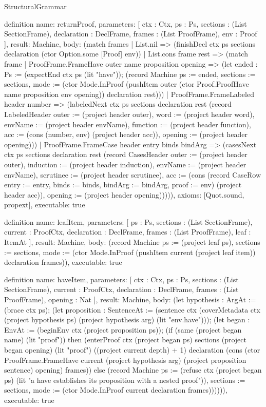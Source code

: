 \begin{lexlean}{StructuralGrammar}
\begin{semanticmodule}
{{definition{
  name: returnProof,
  parameters: [
    ctx : Ctx,
    ps : Ps,
    sections : (List SectionFrame),
    declaration : DeclFrame,
    frames : (List ProofFrame),
    env : Proof
  ],
  result: Machine,
  body: (match frames
    | List.nil => (finishDecl ctx ps sections declaration (ctor Option.some [Proof] env))
    | List.cons frame rest => (match frame
      | ProofFrame.FrameHave outer name proposition opening => (let ended : Ps := (expectEnd ctx ps (lit "have")); (record Machine {ps := ended, sections := sections, mode := (ctor Mode.InProof (pushItem outer (ctor Proof.ProofHave name proposition env opening)) declaration rest)}))
      | ProofFrame.FrameLabeled header number => (labeledNext ctx ps sections declaration rest (record LabeledHeader {outer := (project header outer), word := (project header word), envName := (project header envName), function := (project header function), acc := (cons (number, env) (project header acc)), opening := (project header opening)}))
      | ProofFrame.FrameCase header entry binds bindArg => (casesNext ctx ps sections declaration rest (record CasesHeader {outer := (project header outer), induction := (project header induction), envName := (project header envName), scrutinee := (project header scrutinee), acc := (cons (record CaseRow {entry := entry, binds := binds, bindArg := bindArg, proof := env}) (project header acc)), opening := (project header opening)})))),
  axioms: [Quot.sound, propext],
  executable: true
}

definition{
  name: leafItem,
  parameters: [
    ps : Ps,
    sections : (List SectionFrame),
    current : ProofCtx,
    declaration : DeclFrame,
    frames : (List ProofFrame),
    leaf : ItemAt
  ],
  result: Machine,
  body: (record Machine {ps := (project leaf ps), sections := sections, mode := (ctor Mode.InProof (pushItem current (project leaf item)) declaration frames)}),
  executable: true
}

definition{
  name: haveItem,
  parameters: [
    ctx : Ctx,
    ps : Ps,
    sections : (List SectionFrame),
    current : ProofCtx,
    declaration : DeclFrame,
    frames : (List ProofFrame),
    opening : Nat
  ],
  result: Machine,
  body: (let hypothesis : ArgAt := (brace ctx ps); (let proposition : SentenceAt := (sentence ctx (coverMetadata ctx (project hypothesis ps) (project hypothesis arg) (lit "env.have"))); (let began : EnvAt := (beginEnv ctx (project proposition ps)); (if (same (project began name) (lit "proof")) then (enterProof ctx (project began ps) sections (project began opening) (lit "proof") ((project current depth) + 1) declaration (cons (ctor ProofFrame.FrameHave current (project hypothesis arg) (project proposition sentence) opening) frames)) else (record Machine {ps := (refuse ctx (project began ps) (lit "a have establishes its proposition with a nested proof")), sections := sections, mode := (ctor Mode.InProof current declaration frames)}))))),
  executable: true
}

}}
\end{semanticmodule}
\end{lexlean}
